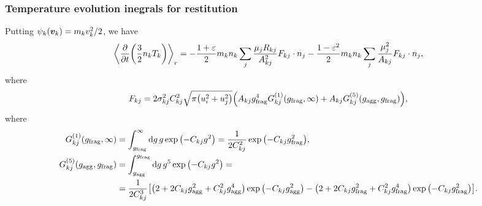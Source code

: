 \documentclass[aps,prl,preprint,groupedaddress,10pt]{revtex4-2}
\begin{document}
\subsubsection{Temperature evolution inegrals for restitution}
Putting $\psi_k(\vb*{v}_k)=m_kv_k^2/2$, we have
\begin{equation}
    \avg{\pdv{t}\pqty{\frac{3}{2}n_k T_k}}_r=-\frac{1+\eps}{2}m_kn_k
    \sum_{j}\frac{\mu_jR_{kj}}{A_{kj}^2}F_{kj}\cdot n_j-
    \frac{1-\eps^2}{2}m_kn_k\sum_{j}\frac{\mu_j^2}{A_{kj}}F_{kj}\cdot n_j,
\end{equation}
where
\begin{equation}
    F_{kj}=2\sigma_{kj}^2C_{kj}^2\sqrt{\pi\pqty{u_i^2+u_j^2}}
    \pqty{A_{kj}\ltx{g}{frag}^4G^{(1)}_{kj}(\ltx{g}{frag},\infty)+
    A_{kj}G^{(5)}_{kj}(\ltx{g}{agg},\ltx{g}{frag})},
\end{equation}
where
\begin{equation}
    \begin{split}
        G^{(1)}_{kj}(\ltx{g}{frag},\infty)&=
        \int_{\ltx{g}{frag}}^{\infty}\dd{g}g\exp\pqty{-C_{kj}g^2}=
        \frac{1}{2C_{kj}^2}\exp\pqty{-C_{kj}\ltx{g}{frag}^2},\\
        G^{(5)}_{kj}(\ltx{g}{agg},\ltx{g}{frag})&=
        \int_{\ltx{g}{agg}}^{\ltx{g}{frag}}\dd{g}g^5\exp\pqty{-C_{kj}g^2}=\\
        &=\frac{1}{2C_{kj}^3}\bqty{\pqty{2+2C_{kj}\ltx{g}{agg}^2+C_{kj}^2\ltx{g}{agg}^4}
        \exp\pqty{-C_{kj}\ltx{g}{agg}^2}-
        \pqty{2+2C_{kj}\ltx{g}{frag}^2+C_{kj}^2\ltx{g}{frag}^4}
        \exp\pqty{-C_{kj}\ltx{g}{frag}^2}}.
    \end{split}
\end{equation}
\end{document}
